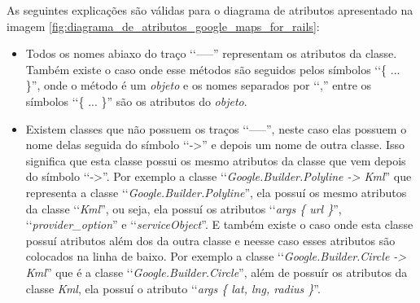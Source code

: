 As seguintes explicações são válidas para o diagrama de atributos apresentado na imagem
\ref{fig:diagrama_de_atributos_google_maps_for_rails}:

\begin{itemize}
 
 \item Todos os nomes abiaxo do traço ‘‘-----'' representam os atributos da classe. Também 
 existe o caso onde esse métodos são seguidos pelos símbolos ‘‘\{ ... \}'', onde o método é um 
 \emph{objeto} e os nomes separados por ‘‘,'' entre os símbolos ‘‘\{ ... \}'' são os atributos
 do \emph{objeto}.
 
 \item Existem classes que não possuem os traços ‘‘-----'', neste caso elas possuem o nome delas
 seguida do símbolo ‘‘->'' e depois um nome de outra classe. Isso significa que esta classe 
 possui os mesmo atributos da classe que vem depois do símbolo ‘‘->''. Por exemplo a 
 classe ‘‘\emph{Google.Builder.Polyline -> Kml}'' que representa a classe 
 ‘‘\emph{Google.Builder.Polyline}'', ela possuí os mesmo atributos da classe
 ‘‘\emph{Kml}'', ou seja, ela possuí os atributos 
 ‘‘\emph{args \{ url \}}'', ‘‘\emph{provider\_option}'' e ‘‘\emph{serviceObject}''. E também existe o caso 
 onde esta classe possuí atributos além dos da outra classe e neesse caso esses 
 atributos são colocados na linha de baixo. Por exemplo a classe 
 ‘‘\emph{Google.Builder.Circle -> Kml}'' que é a classe ‘‘\emph{Google.Builder.Circle}'', além de 
 possuír os atributos da classe \emph{Kml}, ela possuí o atributo 
 ‘‘\emph{args \{ lat, lng, radius \}}''.
 
\end{itemize}

